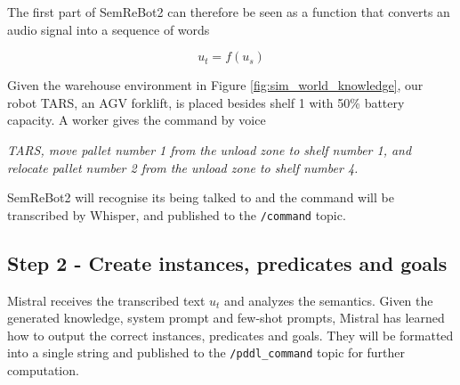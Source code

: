 The first part of SemReBot2 can therefore be seen as a function that converts an audio signal into a sequence of words

\begin{equation}
    \label{eq:whisper_function}
    u_{t}=f(u_{s})
\end{equation}

\begin{example}\label{ex:whisper}
    Given the warehouse environment in Figure \ref{fig:sim_world_knowledge}, our robot TARS, an AGV forklift, is placed besides shelf 1 with 50\% battery capacity. A worker gives the command by voice

    \textit{TARS, move pallet number 1 from the unload zone to shelf number 1, and relocate pallet number 2 from the unload zone to shelf number 4.}

    SemReBot2 will recognise its being talked to and the command will be transcribed by Whisper, and published to the \verb|/command| topic.
\end{example}

\subsection{Step 2 - Create instances, predicates and goals}
Mistral receives the transcribed text $u_{t}$ and analyzes the semantics. Given the generated knowledge, system prompt and few-shot prompts, Mistral has learned how to output the correct instances, predicates and goals. They will be formatted into a single string and published to the \verb|/pddl_command| topic for further computation.

